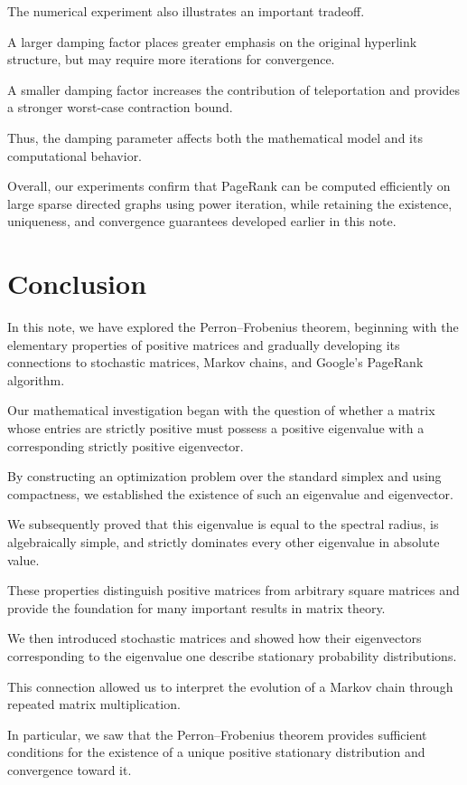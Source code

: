 \documentclass[11pt,a4paper]{article}
\theoremstyle{definition}
\theoremstyle{remark}
\begin{document}
The numerical experiment
also illustrates an
important tradeoff.

A larger damping factor
places greater emphasis
on the original hyperlink
structure, but may require
more iterations for convergence.

A smaller damping factor
increases the contribution
of teleportation and
provides a stronger
worst-case contraction bound.

Thus, the damping parameter
affects both the mathematical
model and its computational
behavior.

Overall, our experiments
confirm that PageRank can
be computed efficiently
on large sparse directed
graphs using power iteration,
while retaining the
existence, uniqueness,
and convergence guarantees
developed earlier in
this note.



\section{Conclusion}

In this note, we have explored the
Perron--Frobenius theorem, beginning with
the elementary properties of positive
matrices and gradually developing its
connections to stochastic matrices,
Markov chains, and Google's PageRank
algorithm.

Our mathematical investigation began
with the question of whether a matrix
whose entries are strictly positive
must possess a positive eigenvalue
with a corresponding strictly positive
eigenvector.

By constructing an optimization problem
over the standard simplex and using
compactness, we established the existence
of such an eigenvalue and eigenvector.

We subsequently proved that this
eigenvalue is equal to the spectral radius,
is algebraically simple, and strictly
dominates every other eigenvalue
in absolute value.

These properties distinguish positive
matrices from arbitrary square matrices
and provide the foundation for many
important results in matrix theory.

We then introduced stochastic matrices
and showed how their eigenvectors
corresponding to the eigenvalue one
describe stationary probability
distributions.

This connection allowed us to interpret
the evolution of a Markov chain through
repeated matrix multiplication.

In particular, we saw that the
Perron--Frobenius theorem provides
sufficient conditions for the existence
of a unique positive stationary
distribution and convergence toward it.
\end{document}
